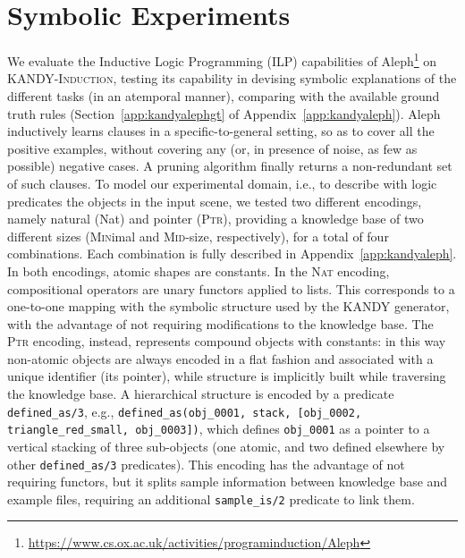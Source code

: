 \section{Symbolic Experiments} We evaluate the Inductive Logic Programming (ILP) capabilities of Aleph\footnote{\url{https://www.cs.ox.ac.uk/activities/programinduction/Aleph}} on \textsc{KANDY-Induction}, testing its capability in devising symbolic explanations of the different tasks (in an atemporal manner), comparing with the available ground truth rules (Section~\ref{app:kandyalephgt} of Appendix~\ref{app:kandyaleph}). 
%
Aleph inductively learns clauses in a specific-to-general setting, so as to cover all the positive examples, without covering any (or, in presence of noise, as few as possible) negative cases. A pruning algorithm finally returns a non-redundant set of such clauses.
%
To model our experimental domain, i.e., to describe with logic predicates the objects in the input scene, we tested two different encodings, namely natural ({\sc\small Nat}) and pointer (\textsc{\small Ptr}), providing a knowledge base of two different sizes (\textsc{\small Min}imal and \textsc{\small Mid}-size, respectively), for a total of four combinations. Each combination is fully described in Appendix~\ref{app:kandyaleph}. 
%
In both encodings, atomic shapes are constants.
%
In the \textsc{\small Nat} encoding, compositional operators are unary functors applied to lists. This corresponds to a one-to-one mapping with the symbolic structure used by the \textsc{KANDY} generator, with the advantage of not requiring modifications to the knowledge base.
%
The \textsc{\small Ptr} encoding, instead, represents compound objects with constants: in this way non-atomic objects are always encoded in a flat fashion and associated with a unique identifier (its pointer), while structure is implicitly built while traversing the knowledge base. A hierarchical structure is encoded by a predicate \texttt{defined\_as/3}, e.g., \texttt{defined\_as(obj\_0001, stack, [obj\_0002, triangle\_red\_small, obj\_0003])}, which defines \texttt{obj\_0001} as a pointer to a vertical stacking of three sub-objects (one atomic, and two defined elsewhere by other \texttt{defined\_as/3} predicates). This encoding has the advantage of not requiring functors, but it splits sample information between knowledge base and example files, requiring an additional \texttt{sample\_is/2} predicate to link them. %

